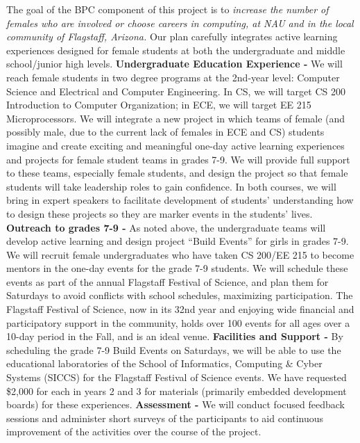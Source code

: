 The goal of the BPC component of this project is to \textit{increase the number of females who are involved or choose careers in computing, at NAU and in the local community of Flagstaff, Arizona.}  Our plan carefully integrates active learning experiences designed for female students at both the undergraduate and middle school/junior high levels.
\textbf{Undergraduate Education Experience -} We will reach female students in two degree programs at the 2nd-year level: Computer Science and Electrical and Computer Engineering. In CS, we will target CS 200 Introduction to Computer Organization; in ECE, we will target EE 215 Microprocessors. We will integrate a new project in which teams of female (and possibly male, due to the current lack of females in ECE and CS) students imagine and create exciting and meaningful one-day active learning experiences and projects for female student teams in grades 7-9.  We will provide full support to these teams, especially female students, and design the project so that female students will take leadership roles to gain confidence.  In both courses, we will bring in expert speakers to facilitate development of students’ understanding how to design these projects so they are marker events in the students’ lives. %
\textbf{Outreach to grades 7-9 -} As noted above, the undergraduate teams will develop active learning and design project “Build Events” for girls in grades 7-9. We will recruit female undergraduates who have taken CS 200/EE 215 to become mentors in the one-day events for the grade 7-9 students.  We will schedule these events as part of the annual Flagstaff Festival of Science, and plan them for Saturdays to avoid conflicts with school schedules, maximizing participation. The Flagstaff Festival of Science, now in its 32nd year and enjoying wide financial and participatory support in the community, holds over 100 events for all ages over a 10-day period in the Fall, and is an ideal venue.
\textbf{Facilities and Support -} By scheduling the grade 7-9 Build Events on Saturdays, we will be able to use the educational laboratories of the School of Informatics, Computing \& Cyber Systems (SICCS) for the Flagstaff Festival of Science events. We have requested \$2,000 for each in years 2 and 3 for materials (primarily embedded development boards) for these experiences.
\textbf{Assessment -} We will conduct focused feedback sessions and administer short surveys of the participants to aid continuous improvement of the activities over the course of the project.